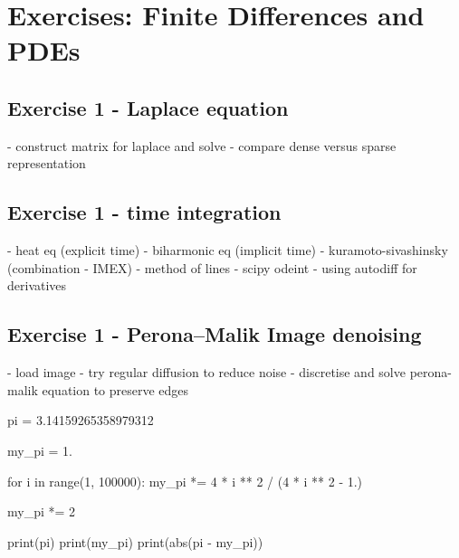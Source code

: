 \documentclass[a4paper]{article}
\begin{document}
\section*{Exercises: Finite Differences and PDEs}

\vspace{0,75cm}


\subsection*{Exercise 1 - Laplace equation}

- construct matrix for laplace and solve
- compare dense versus sparse representation

\subsection*{Exercise 1 - time integration}

- heat eq (explicit time)
- biharmonic eq (implicit time)
- kuramoto-sivashinsky (combination - IMEX)
- method of lines - scipy odeint - using autodiff for derivatives

\subsection*{Exercise 1 - Perona–Malik Image denoising}

- load image
- try regular diffusion to reduce noise
- discretise and solve perona-malik equation to preserve edges

 
\begin{solution}
\begin{python}
pi = 3.14159265358979312

my_pi = 1.

for i in range(1, 100000):
    my_pi *= 4 * i ** 2 / (4 * i ** 2 - 1.)

my_pi *= 2

print(pi)
print(my_pi)
print(abs(pi - my_pi))
\end{python}
\end{solution}
\end{document}
